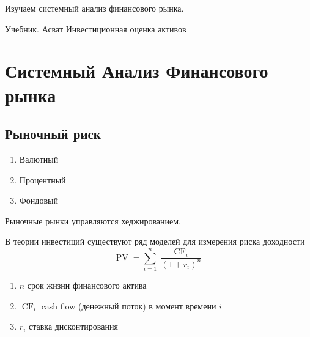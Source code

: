 \documentclass[14pt]{extarticle}
\title{}
\author{}
\date{}
\DeclareMathOperator{\pv}{PV}
\DeclareMathOperator{\cf}{CF}
\begin{document}
	\maketitle
	Изучаем системный анализ финансового рынка.

	Учебник. Асват Инвестиционная оценка активов
	\section{Системный Анализ Финансового рынка}
	\subsection{Рыночный риск}
	\begin{enumerate}
		\item Валютный
		\item Процентный
		\item Фондовый 
	\end{enumerate}
	Рыночные рынки управляются хеджированием.

	В теории инвестиций
	существуют ряд 
	моделей для измерения
	риска доходности
	\begin{equation}
		\pv = \sum_{i = 1}^{n} \frac{\cf_{i}}{(1 + r_{i})^{n}}
	\end{equation} 
	\begin{enumerate}
		\item $n$ срок жизни финансового актива
		\item $\cf_{i}$ cash flow (денежный поток) в момент времени $i$
		\item  $r_{i}$ ставка дисконтирования
	\end{enumerate}
\end{document}
